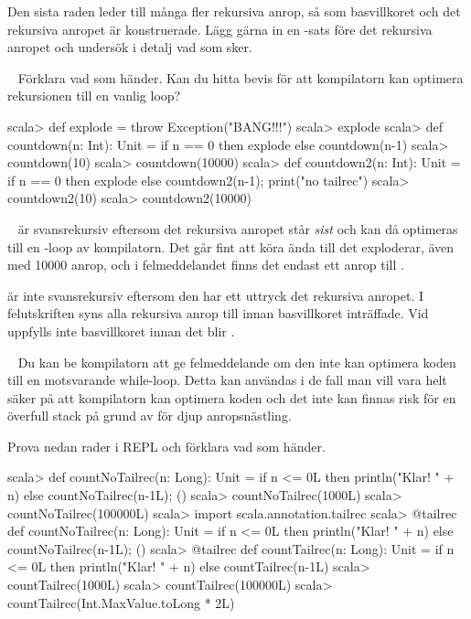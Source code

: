 \SubtaskSolved
Den sista raden leder till många fler rekursiva anrop, så som basvillkoret och det rekursiva anropet är konstruerade. Lägg gärna in en -sats före det rekursiva anropet och undersök i detalj vad som sker.

\QUESTEND




\QUESTBEGIN

\Task\Uberkurs  \what~  Förklara vad som händer. Kan du hitta bevis för att kompilatorn kan optimera rekursionen till en vanlig loop?

\begin{REPL}
scala> def explode = throw Exception("BANG!!!")
scala> explode
scala> def countdown(n: Int): Unit =
         if n == 0 then explode else countdown(n-1)
scala> countdown(10)
scala> countdown(10000)
scala> def countdown2(n: Int): Unit =
         if n == 0 then explode else {countdown2(n-1); print("no tailrec")}
scala> countdown2(10)
scala> countdown2(10000)
\end{REPL}

\SOLUTION

\TaskSolved \what~ är svansrekursiv eftersom det rekursiva anropet står \emph{sist} och kan då optimeras till en -loop av kompilatorn. Det går fint att köra ända till det exploderar, även med 10000 anrop, och i felmeddelandet finns det endast ett anrop till .

 är inte svansrekursiv eftersom den har ett uttryck  det rekursiva anropet. I felutskriften syns alla rekursiva anrop till  innan basvillkoret inträffade. Vid  uppfylls inte basvillkoret innan det blir .

\QUESTEND




\QUESTBEGIN

\Task\Uberkurs  \what~  Du kan be kompilatorn att ge felmeddelande om den inte kan optimera koden till en motsvarande while-loop. Detta kan användas i de fall man vill vara helt säker på att kompilatorn kan optimera koden och det inte kan finnas risk för en överfull stack  på grund av för djup anropsnästling.

Prova nedan rader i REPL och förklara vad som händer.
\begin{REPL}
scala> def countNoTailrec(n: Long): Unit =
         if n <= 0L then println("Klar! " + n) else {countNoTailrec(n-1L); ()}
scala> countNoTailrec(1000L)
scala> countNoTailrec(100000L)
scala> import scala.annotation.tailrec
scala> @tailrec def countNoTailrec(n: Long): Unit =
         if n <= 0L then println("Klar! " + n) else {countNoTailrec(n-1L); ()}
scala> @tailrec def countTailrec(n: Long): Unit =
         if n <= 0L then println("Klar! " + n) else countTailrec(n-1L)
scala> countTailrec(1000L)
scala> countTailrec(100000L)
scala> countTailrec(Int.MaxValue.toLong * 2L)
\end{REPL}

